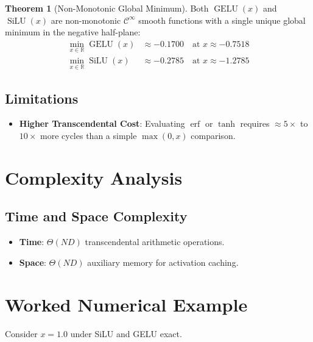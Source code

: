 \documentclass[11pt,a4paper]{article}
\theoremstyle{definition}
\newtheorem{theorem}{Theorem}[section]
\begin{document}
\begin{theorem}[Non-Monotonic Global Minimum]
Both $\operatorname{GELU}(x)$ and $\operatorname{SiLU}(x)$ are non-monotonic $\mathcal{C}^\infty$ smooth functions with a single unique global minimum in the negative half-plane:
\begin{align}
\min_{x \in \mathbb{R}} \operatorname{GELU}(x) &\approx -0.1700 \quad \text{at } x \approx -0.7518 \\
\min_{x \in \mathbb{R}} \operatorname{SiLU}(x) &\approx -0.2785 \quad \text{at } x \approx -1.2785
\end{align}
\end{theorem}

\subsection{Limitations}
\begin{itemize}
    \item \textbf{Higher Transcendental Cost}: Evaluating $\operatorname{erf}$ or $\tanh$ requires $\approx 5\times$ to $10\times$ more cycles than a simple $\max(0, x)$ comparison.
\end{itemize}

\section{Complexity Analysis}

\subsection{Time and Space Complexity}
\begin{itemize}
    \item \textbf{Time}: $\Theta(ND)$ transcendental arithmetic operations.
    \item \textbf{Space}: $\Theta(ND)$ auxiliary memory for activation caching.
\end{itemize}

\section{Worked Numerical Example}

Consider $x = 1.0$ under SiLU and GELU exact.
\end{document}
